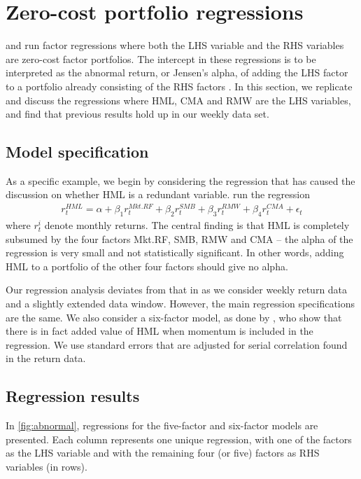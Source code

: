 
\section{Zero-cost portfolio regressions}
\label{sec:alpha_reg}
\textcite{FF2015} and \textcite{Asness2015} run factor regressions where both the LHS variable and the RHS variables are zero-cost factor portfolios. The intercept in these regressions is to be interpreted as the abnormal return, or Jensen's alpha, of adding the LHS factor to a portfolio already consisting of the RHS factors \autocite{Jensen1968}. In this section, we replicate and discuss the regressions where HML, CMA and RMW are the LHS variables, and find that previous results hold up in our weekly data set.

\subsection{Model specification}

As a specific example, we begin by considering the regression that has caused the discussion on whether HML is a redundant variable. \textcite{FF2015} run the regression
\begin{align}
  r^{HML}_t = \alpha + \beta_1 r^{Mkt.RF}_t + \beta_2 r^{SMB}_t + \beta_3 r^{RMW}_t + \beta_4 r^{CMA}_t + \epsilon_t
\end{align}
where $r^i_t$ denote monthly returns. The central finding is that HML is completely subsumed by the four factors Mkt.RF, SMB, RMW and CMA -- the alpha of the regression is very small and not statistically significant. In other words, adding HML to a portfolio of the other four factors should give no alpha.

Our regression analysis deviates from that in \textcite{FF2015} as we consider weekly return data and a slightly extended data window. However, the main regression specifications are the same. We also consider a six-factor model, as done by \textcite{Asness2015}, who show that there is in fact added value of HML when momentum is included in the regression. We use standard errors that are adjusted for serial correlation found in the return data.

\subsection{Regression results}

In \autoref{fig:abnormal}, regressions for the five-factor and six-factor models are presented. Each column represents one unique regression, with one of the factors as the LHS variable and with the remaining four (or five) factors as RHS variables (in rows).

